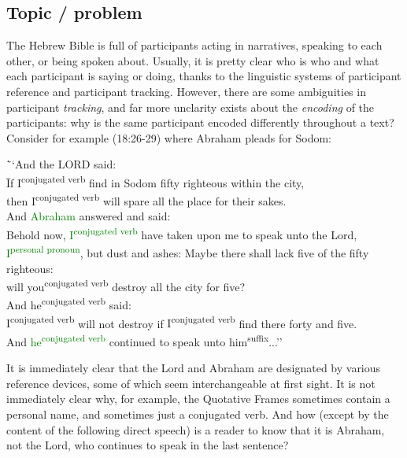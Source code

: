 \documentclass[twoside,a4paper,10pt]{article}
\begin{document}
\subsection{Topic / problem}
The Hebrew Bible is full of participants acting in narratives, speaking to each other, or being spoken about. Usually, it is pretty clear who is who and what each participant is saying or doing, thanks to the linguistic systems of participant reference and participant tracking.
However, there are some ambiguities in participant \emph{tracking}, and far more unclarity exists about the \emph{encoding} of the participants: why is the same participant encoded differently throughout a text? Consider for example (18:26-29) where Abraham pleads for Sodom:
\begin{tabbing}
\hspace{2ex} \= ``And \textcolor{BrickRed}{the LORD} said:\\
\> \hspace{2ex} \= If \textcolor{BrickRed}{I\textsuperscript{conjugated verb}} find in Sodom fifty righteous within the city, \\
\>\>then \textcolor{BrickRed}{I\textsuperscript{conjugated verb}} will spare all the place for their sakes.\\
\> And \textcolor{Green}{Abraham} answered and said:\\
\>\>Behold now, \textcolor{Green}{I\textsuperscript{conjugated verb}} have taken upon me to speak unto \textcolor{BrickRed}{the Lord}, \\
\>\>\textcolor{Green}{I\textsuperscript{personal pronoun}}, but dust and ashes: Maybe there shall lack five of the fifty righteous: \\ \>\>
will \textcolor{BrickRed}{you\textsuperscript{conjugated verb}} destroy all the city for five?\\
\>And \textcolor{BrickRed}{he\textsuperscript{conjugated verb}} said:\\
\>\>\textcolor{BrickRed}{I\textsuperscript{conjugated verb}} will not destroy if \textcolor{BrickRed}{I\textsuperscript{conjugated verb}} find there forty and five.\\
\> And \textcolor{Green}{he\textsuperscript{conjugated verb}} continued to speak unto \textcolor{BrickRed}{him\textsuperscript{suffix}}...''
\end{tabbing}
It is immediately clear that the Lord and Abraham are designated by various reference devices, some of which seem interchangeable at first sight. It is not immediately clear why, for example, the Quotative Frames sometimes contain a personal name, and sometimes just a conjugated verb. And how (except by the content of the following direct speech) is a reader to know that it is Abraham, not the Lord, who continues to speak in the last sentence?
\end{document}
